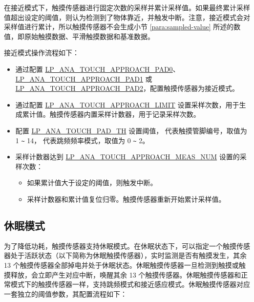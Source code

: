 \documentclass[main\_\_CN.tex]{subfiles}
\begin{document}
在接近模式下，触摸传感器进行固定次数的采样并累计采样值。如果最终累计采样值超出设定的阈值，则认为检测到了物体靠近，并触发中断。注意，接近模式会对采样值进行累计，所以触摸传感器不会生成小节 \ref{para:sampled-value} 所述的数值，即原始触摸数据、平滑触摸数据和基准数据。

接近模式操作流程如下：

\begin{itemize}
    \item 通过配置 \hyperref[fielddesc:LPANATOUCHAPPROACHPAD0]{LP\_ANA\_TOUCH\_APPROACH\_PAD0}、\hyperref[fielddesc:LPANATOUCHAPPROACHPAD1]{LP\_ANA\_TOUCH\_APPROACH\_PAD1} 或 \hyperref[fielddesc:LPANATOUCHAPPROACHPAD2]{LP\_ANA\_TOUCH\_APPROACH\_PAD2}，配置触摸传感器为接近模式。
    \item 通过配置 \hyperref[fielddesc:LPANATOUCHAPPROACHLIMIT]{LP\_ANA\_TOUCH\_APPROACH\_LIMIT} 设置采样次数，用于生成累计值。触摸传感器内置采样计数器，用于记录采样次数。
    \item 配置 \hyperref[fielddesc:LPANATOUCHPAD0TH0]{LP\_ANA\_TOUCH\_PAD\_TH} 设置阈值， 代表触摸管脚编号，取值为 1 \verb+~+ 14， 代表跳频频率模式，取值为 0 \verb+~+ 2。
    \item 采样计数器达到 \hyperref[fielddesc:LPANATOUCHAPPROACHMEASNUM0]{LP\_ANA\_TOUCH\_APPROACH\_MEAS\_NUM} 设置的采样次数：
    \begin{itemize}
        \item 如果累计值大于设定的阈值，则触发中断。
        \item 采样计数器和累计值复位归零。触摸传感器重新开始累计采样值。
    \end{itemize}
\end{itemize}

\subsection{休眠模式}

为了降低功耗，触摸传感器支持休眠模式。在休眠状态下，可以指定一个触摸传感器处于活跃状态（以下简称为休眠触摸传感器），实时监测是否有触摸发生，其余 13 个触摸传感器全部掉电并处于休眠状态。休眠触摸传感器一旦检测到触摸或触摸释放，会立即产生对应中断，唤醒其余 13 个触摸传感器。休眠触摸传感器和正常模式下的触摸传感器一样，支持跳频模式和接近感应模式。休眠触摸传感器对应一套独立的阈值参数，其配置流程如下：
\end{document}

